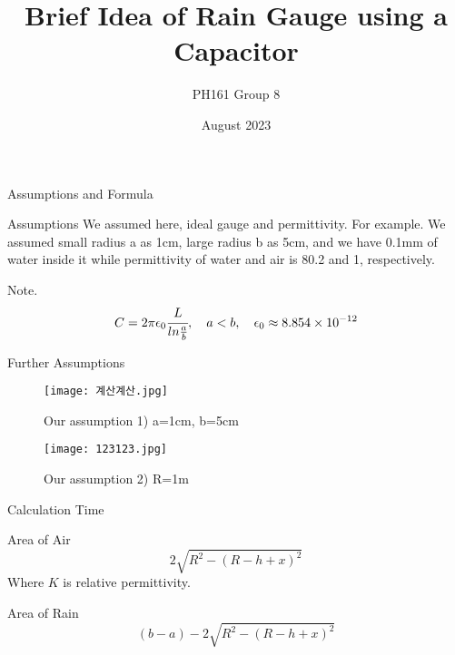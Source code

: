 \documentclass{beamer}
\title{Brief Idea of Rain Gauge using a Capacitor}
\author{PH161 Group 8}
\date{August 2023}
\begin{document}
\begin{frame}
\maketitle
\end{frame}

\begin{frame}{Assumptions and Formula}
    \begin{block}{Assumptions}
        We assumed here, ideal gauge and permittivity. For example. We assumed small radius a as 1cm, large radius b as 5cm, and we have 0.1mm of water inside it while permittivity of water and air is 80.2 and 1, respectively.
    \end{block}
    \begin{block}{Note.}
        \begin{equation}
            \nonumber C=2\pi\epsilon_0\cfrac{L}{ln\frac{a}{b}}, \quad a<b, \quad \epsilon_0\approx8.854\times10^{-12}
        \end{equation}
    \end{block}
\end{frame}

\begin{frame}{Further Assumptions}
    \begin{figure}[h]
\centering
\begin{minipage}[b]{0.4\textwidth}
\texttt{[image: 계산계산.jpg]}
\caption{Our assumption 1) a=1cm, b=5cm}
\end{minipage}
\hfill
\begin{minipage}[b]{0.42\textwidth}
\texttt{[image: 123123.jpg]}
\caption{Our assumption 2) R=1m} 
\end{minipage}
\end{figure}
\end{frame}

\begin{frame}{Calculation Time}
    \begin{block}{Area of Air}
        \begin{equation}
            2\sqrt{R^2-(R-h+x)^2}
        \end{equation}
        Where $K$ is relative permittivity.
    \end{block}
    \begin{block}{Area of Rain}
        \begin{equation}
            (b-a)-2\sqrt{R^2-(R-h+x)^2}
        \end{equation}
    \end{block}
\end{frame}
\end{document}
